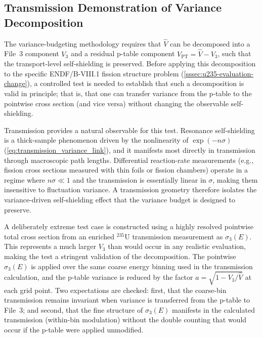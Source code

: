 \documentclass{style/nseJournal}
\newcommand{\isotope}[2]{\ensuremath{^{#1}\mathrm{#2}}}
\begin{document}
\subsection{Transmission Demonstration of Variance Decomposition}
\label{ssec:transmission-demo}

The variance-budgeting methodology requires that $\hat{V}$ can be decomposed into a File~3 component $V_3$ and a residual p-table component $V_{\text{PT}} = \hat{V} - V_3$, such that the transport-level self-shielding is preserved. Before applying this decomposition to the specific ENDF/B-VIII.1 fission structure problem (\autoref{sssec:u235-evaluation-change}), a controlled test is needed to establish that such a decomposition is valid in principle; that is, that one can transfer variance from the p-table to the pointwise cross section (and vice versa) without changing the observable self-shielding.

Transmission provides a natural observable for this test. Resonance self-shielding is a thick-sample phenomenon driven by the nonlinearity of $\exp(-n\sigma)$ (\autoref{eq:transmission_variance_link}), and it manifests most directly in transmission through macroscopic path lengths. Differential reaction-rate measurements (e.g., fission cross sections measured with thin foils or fission chambers) operate in a regime where $n\sigma \ll 1$ and the transmission is essentially linear in $\sigma$, making them insensitive to fluctuation variance. A transmission geometry therefore isolates the variance-driven self-shielding effect that the variance budget is designed to preserve.

A deliberately extreme test case is constructed using a highly resolved pointwise total cross section from an enriched \isotope{235}{U} transmission measurement \cite{harvey1988} as $\sigma_3(E)$. This represents a much larger $V_3$ than would occur in any realistic evaluation, making the test a stringent validation of the decomposition. The pointwise $\sigma_3(E)$ is applied over the same coarse energy binning used in the transmission calculation, and the p-table variance is reduced by the factor $a = \sqrt{1 - V_3/\hat{V}}$ at each grid point. Two expectations are checked: first, that the coarse-bin transmission remains invariant when variance is transferred from the p-table to File~3; and second, that the fine structure of $\sigma_3(E)$ manifests in the calculated transmission (within-bin modulation) without the double counting that would occur if the p-table were applied unmodified.
\end{document}
